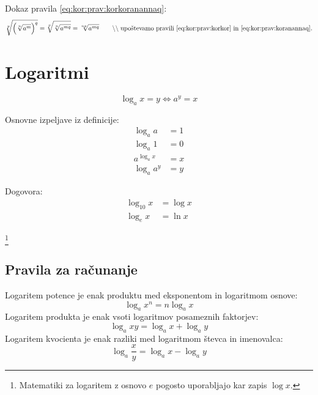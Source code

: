 \documentclass[a4paper,oneside,12pt,fleqn]{article}
\newcommand{\comment}[1]{\ensuremath{\qquad\backslash\backslash\;}\textnormal{#1}}
\renewcommand\iff\Leftrightarrow
\numberwithin{equation}{section}
\begin{document}
Dokaz pravila \ref{eq:kor:prav:korkoranannaq}:
\[  \sqrt[p]{\left( \sqrt[n]{a^m} \right)^q} = \sqrt[p]{\sqrt[n]{a^{mq}}} =
\sqrt[np]{a^{mq}} \comment{upoštevamo pravili \eqref{eq:kor:prav:korkor} in
\eqref{eq:kor:prav:koranannaq}.} \]

\section{Logaritmi}
\label{sec:log}
\begin{equation}
  \label{eq:log:def}
  \log_a\! x = y \iff a^y = x 
\end{equation}

Osnovne izpeljave iz definicije:
\begin{align}
  \log_a\! a &= 1 \label{eq:log:logaaje1} \\
  \log_a\! 1 &= 0 \label{eq:log:log1je0} \\
  a^{\log_a\! x} &= x \label{eq:log:analogax} \\
  \log_a\! a^y &= y \label{eq:log:logaanay}
\end{align}

Dogovora:
\begin{align*}
  \log_{10}\!x &= \log x \\
  \log_{e}\!x &= \ln x
\end{align*}

\vspace{-24pt}
\hspace{95pt}
\footnote{Matematiki za logaritem z osnovo $e$ pogosto uporabljajo
kar zapis $\log x$.}

\subsection{Pravila za računanje}
\label{sec:eq:log:prav}
Logaritem potence je enak produktu med eksponentom in logaritmom osnove:
\begin{equation}
  \log_a\! x^n = n\log_a\! x \label{eq:log:prav:loganan}
\end{equation}
Logaritem produkta je enak vsoti logaritmov posameznih faktorjev:
\begin{equation}
  \log_a\! xy = \log_a\!x+ \log_a\!y \label{eq:log:prav:logprod}
\end{equation}
Logaritem kvocienta je enak razliki med logaritmom števca in imenovalca:
\begin{equation}
  \log_a\!\frac{x}{y} = \log_a\!x-\log_a\!y \label{eq:log:prav:logkvoc}
\end{equation}
\end{document}
